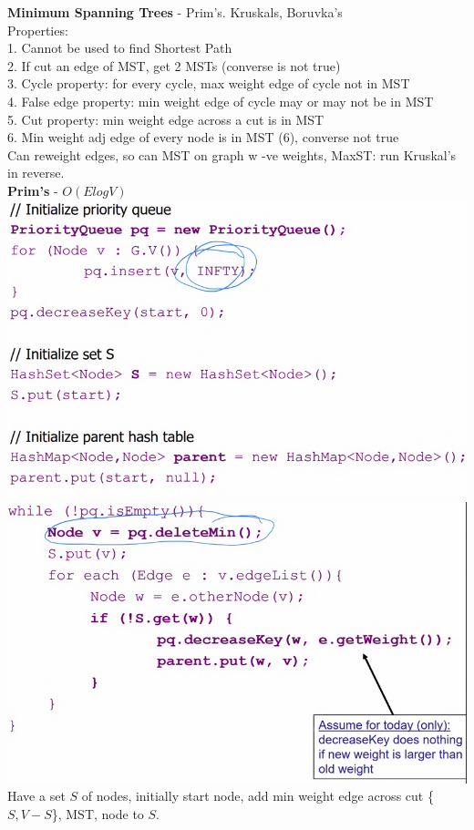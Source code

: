 \documentclass[10pt, a4paper]{article}
\begin{document}
\begin{multicols*}{3}
		{\normalsize\textbf{Minimum Spanning Trees}} - Prim's. Kruskals, Boruvka's\\
		Properties:\\
		1. Cannot be used to find Shortest Path\\
		2. If cut an edge of MST, get 2 MSTs (converse is not true)\\
		3. Cycle property: for every cycle, max weight edge of cycle not in MST\\
		4. False edge property: min weight edge of cycle may or may not be in MST\\
		5. Cut property: min weight edge across a cut is in MST\\
		6. Min weight adj edge of every node is in MST (6), converse not true\\
		Can reweight edges, so can MST on graph w -ve weights, MaxST: run Kruskal's in reverse.\\
		\textbf{Prim's} - $O(ElogV)$\\ 
		\includegraphics[scale=.2]{Prim}\\
		\includegraphics[scale=.18]{Prim2} Have a set $S$ of nodes, initially start node, add min weight edge across cut \{$S, V - S$\}, MST, node to $S$.\\

\end{multicols*}
\end{document}
